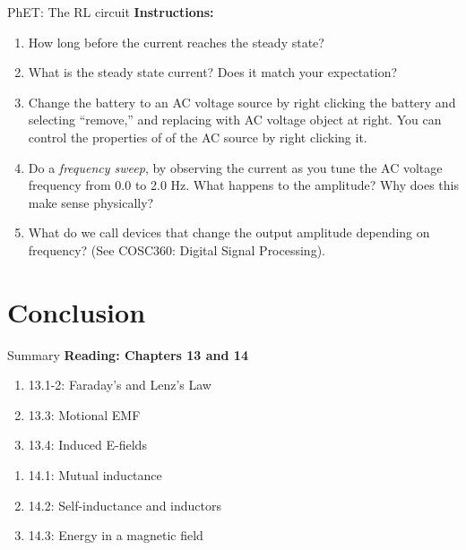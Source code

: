\documentclass{beamer}
\begin{document}
\begin{frame}{PhET: The RL circuit}
\small
\textbf{Instructions:}
\begin{enumerate}
\item How long before the current reaches the steady state?
\item What is the steady state current? Does it match your expectation?
\item Change the battery to an AC voltage source by right clicking the battery and selecting ``remove,'' and replacing with AC voltage object at right.  You can control the properties of of the AC source by right clicking it.
\item Do a \textit{frequency sweep}, by observing the current as you tune the AC voltage frequency from 0.0 to 2.0 Hz.  What happens to the amplitude?  Why does this make sense physically?
\item What do we call devices that change the output amplitude depending on frequency? (See COSC360: Digital Signal Processing).
\end{enumerate}
\end{frame}

\section{Conclusion}

\begin{frame}{Summary}
\textbf{Reading: Chapters 13 and 14} \\ \vspace{0.5cm}
\begin{enumerate}
\item 13.1-2: Faraday's and Lenz's Law
\item 13.3: Motional EMF
\item 13.4: Induced E-fields
\end{enumerate}
\begin{enumerate}
\item 14.1: Mutual inductance
\item 14.2: Self-inductance and inductors
\item 14.3: Energy in a magnetic field
\end{enumerate}
\end{frame}
\end{document}
